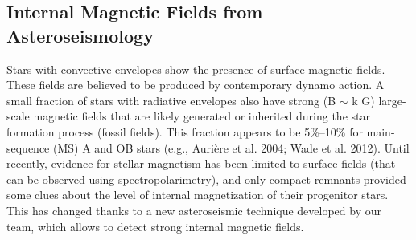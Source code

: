 {\color{red}\subsection{Internal Magnetic Fields from Asteroseismology}}
Stars with convective envelopes show the presence of
surface magnetic fields. These fields are believed to be produced by contemporary dynamo action.
A small fraction of stars with radiative envelopes also have strong (B $\sim$ k G)
large-scale magnetic fields that are likely generated or inherited during the star
formation process (fossil fields). This fraction appears to be 5\%–10\% for main-sequence (MS)
A and OB stars (e.g., Aurière et al. 2004; Wade et al. 2012).
Until recently, evidence for stellar magnetism has been limited to surface fields (that can be observed using spectropolarimetry),
and only compact remnants provided some clues about the level of internal magnetization of their progenitor stars.
This has changed thanks to a new asteroseismic technique developed by our team, which allows to detect strong internal magnetic fields.